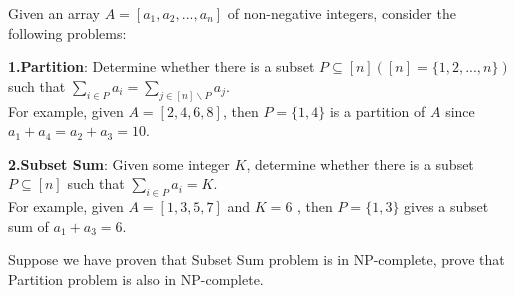 
Given an array \(A=[a_1,a_2,...,a_n]\) of non-negative integers, consider the following problems:

\textbf{1.Partition}: Determine whether there is a subset $P\subseteq[n] ([n]=\{1,2,...,n\})$ such that $\sum_{i\in P} a_i = \sum_{j\in[n]\backslash P} a_j $.\\
For example, given $A=[2,4,6,8]$, then $P=\{1, 4\}$ is a partition of $A$ since $a_1+a_4=a_2+a_3=10$.

\textbf{2.Subset Sum}: Given some integer $K$, determine whether there is a subset $P \subseteq [n]$ such that $\sum_{i\in P}a_i = K$.\\
For example, given $A=[1, 3, 5, 7]$ and $K=6$ , then $P=\{1, 3\}$ gives a subset sum of $a_1+a_3=6$.

Suppose we have proven that Subset Sum problem is in NP-complete, prove that Partition problem is also in NP-complete.

